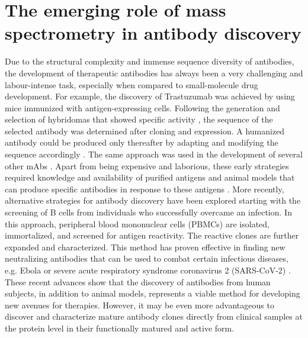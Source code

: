 \section{The emerging role of mass spectrometry in antibody discovery}
Due to the structural complexity and immense sequence diversity of antibodies, the development of therapeutic antibodies has always been a very challenging and labour-intense task, especially when compared to small-molecule drug development. For example, the discovery of Trastuzumab was achieved by using mice immunized with antigen-expressing cells. Following the generation and selection of hybridomas that showed specific activity \cite{hudziak1989p}, the sequence of the selected antibody was determined after cloning and expression. A humanized antibody could be produced only thereafter by adapting and modifying the sequence accordingly \cite{carter1992humanization}. The same approach was used in the development of several other mAbs \cite{tsurushita2005design, khoja2015pembrolizumab, busse2001omalizumab, presta1993humanization}. Apart from being expensive and laborious, these early strategies required knowledge and availability of purified antigens and animal models that can produce specific antibodies in response to these antigens \cite{lu2020development}.
More recently, alternative strategies for antibody discovery have been explored starting with the screening of B cells from individuals who successfully overcame an infection. In this approach, peripheral blood mononuclear cells (PBMCs) are isolated, immortalized, and screened for antigen reactivity. The reactive clones are further expanded and characterized. This method has proven effective in finding new neutralizing antibodies that can be used to combat certain infectious diseases, e.g. Ebola \cite{bornholdt2016isolation, corti2016protective} or severe acute respiratory syndrome coronavirus 2 (SARS-CoV-2) \cite{valgardsdottir2021identification}. These recent advances show that the discovery of antibodies from human subjects, in addition to animal models, represents a viable method for developing new avenues for therapies. However, it may be even more advantageous to discover and characterize mature antibody clones directly from clinical samples at the protein level in their functionally matured and active form.

